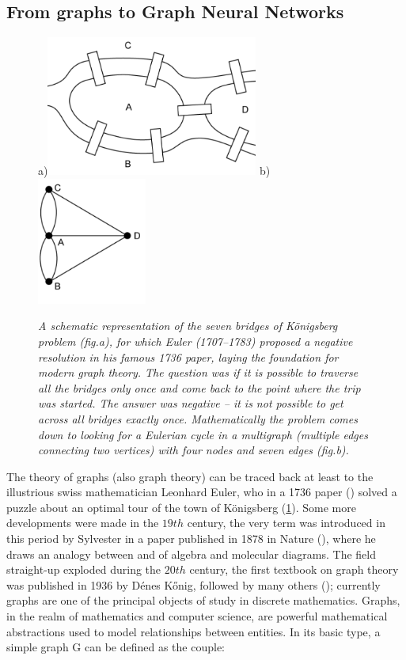\documentclass[binding=0.6cm]{sapthesis}
\newcommand{\mycite}[1]{(\cite{#1})}
\begin{document}
\subsection{From graphs to Graph Neural Networks}
\label{sec:bg.gnn.graph-base}

\begin{figure}
    \centering
    \footnotesize a)\includegraphics[width=0.62\textwidth]{imgs/background/euler-bridges-01.png}
    \footnotesize b)\includegraphics[width=0.32\textwidth]{imgs/background/euler-bridges-03.png}
    \caption{\textit{A schematic representation of the seven bridges of Königsberg problem (fig.a), for which Euler (1707–1783) proposed a negative resolution in his famous 1736 paper, laying the foundation for modern graph theory. The question was if it is possible to traverse all the bridges only once and come back to the point where the trip was started. The answer was negative – it is not possible to get across all bridges exactly once. Mathematically the problem comes down to looking for a Eulerian cycle in a multigraph (multiple edges connecting two vertices) with four nodes and seven edges (fig.b).}}
    \label{fig:bg.gnn.konigsbridge}
\end{figure}
The theory of graphs (also graph theory) can be traced back at least to the illustrious swiss mathematician Leonhard Euler, who in a 1736 paper \mycite{gazette_1987} solved a puzzle about an optimal tour of the town of Königsberg (\cref{fig:bg.gnn.konigsbridge}). Some more developments were made in the $19th$ century, the very term  was introduced in this period by Sylvester in a paper published in 1878 in Nature \mycite{Sylvester1878ChemistryAA}, where he draws an analogy between  and  of algebra and molecular diagrams. The field straight-up exploded during the $20th$ century, the first textbook on graph theory was published in 1936 by Dénes Kőnig, followed by many others \mycite{tutte2001graph}; currently graphs are one of the principal objects of study in discrete mathematics. Graphs, in the realm of mathematics and computer science, are powerful mathematical abstractions used to model relationships between entities. In its basic type, a simple graph G can be defined as the couple:
\end{document}
